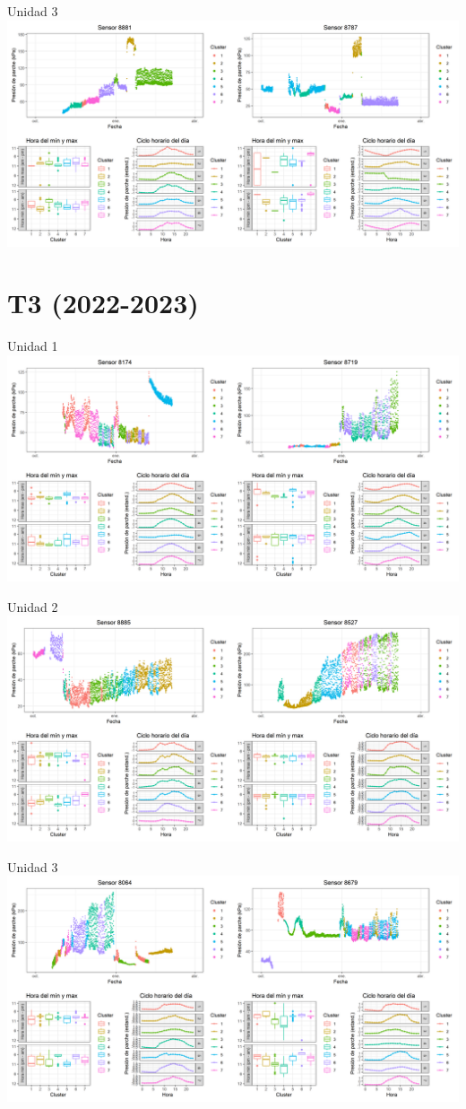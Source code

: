 \documentclass[
  letterpaper,
  DIV=11,
  numbers=noendperiod]{scrreprt}
\begin{document}
Unidad 3
\includegraphics{figuras/01_turgor_sensor/2022_2023_La_Esperanza_T2_Unidad_3.png}

\chapter{T3 (2022-2023)}

Unidad 1
\includegraphics{figuras/01_turgor_sensor/2022_2023_La_Esperanza_T3_Unidad_1.png}

Unidad 2
\includegraphics{figuras/01_turgor_sensor/2022_2023_La_Esperanza_T3_Unidad_2.png}

Unidad 3
\includegraphics{figuras/01_turgor_sensor/2022_2023_La_Esperanza_T3_Unidad_3.png}
\end{document}
